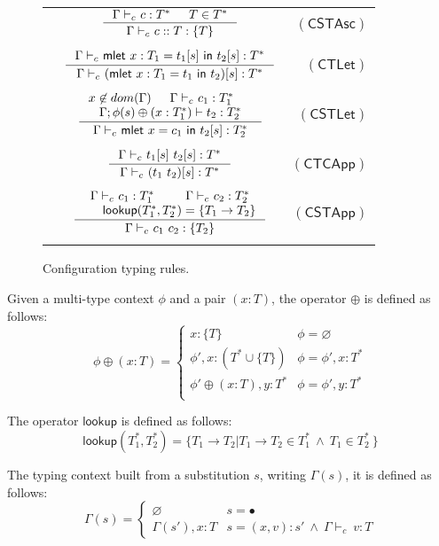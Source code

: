 \documentclass[preprint,authoryear,sort&compress,9pt,nocopyrightspace]{article}
\newcommand\rulename[1]{\mathsf{(#1)}}
\newcommand{\conf}[2][s]{(#2)[#1]}
\newcommand{\tyC}{{\Gamma \vdash_c \ }}
\newcommand{\ascrip}[1]{#1::T}
\newcommand{\oletP}[3]{\mathsf{mlet} \ x = #2 \ \mathsf{in}  \ #3}
\newcommand{\appD}{t_1 \ t_2}
\newcommand{\oletPT}[3]{\mathsf{mlet} \ x : #1 = #2 \ \mathsf{in}  \ #3}
\newcommand{\buscar}{\mathsf{lookup}}
\newcommand{\mtD}{T^{*}}
\newcommand{\mtP}[1]{#1^{*}}
\newcommand{\mtCu}[1]{\{ #1 \}}
\newcommand{\emt}{\phi}
\begin{document}
\begin{figure}
\begin{small}
\begin{center}
\begin{tabular}{|l c r|}
&$\inference{\tyC c : T^{*} & T \in  \mtD}{\tyC \ascrip{c} : \mtCu{T}}$&$\rulename{CSTAsc}$\\
&&\\
&$\inference{\tyC \oletPT{T_1}{t_1[s]}{t_2[s] : \mtP{T}}}{\tyC \conf{\oletPT{T_1}{t_1}{t_2}} : \mtP{T}}$&$\rulename{CTLet}$\\
&&\\
&$\inference{x \not \in dom(\Gamma) & \tyC c_1 : \mtP{T_1}  & \\ \Gamma ; \emt(s)  \oplus (x : T^{*}_1)  \vdash t_2 : \mtP{T_2}}{\tyC \oletP{T_1}{c_1}{t_2[s]} : \mtP{T_2}}$&$\rulename{CSTLet}$\\
&&\\
&$\inference {\tyC t_1[s] \ t_2[s] : \mtP{T}}{\tyC \conf{\appD} : \mtP{T}}$&$\rulename{CTCApp}$\\
&&\\
&$\inference {\tyC c_1 : T_1^{*} & \tyC c_2 : T_2^{*}  \\ & \buscar (T_1^{*}, T_2^{*}) = \{T_1 \to T_2\}}{\tyC c_1 \ c_2 : \{T_2\}}$&$\rulename{CSTApp}$\\
&&\\
\hline
\end{tabular}
\hspace*{-2.8cm}
\caption{Configuration typing rules.}
\label{tabla:confugurationtypingrule}
\end{center}

\end{small}
\end{figure}

\begin{definition}[$\oplus$]
\label{definition:tcs}
\mbox{}
Given a multi-type context $\emt$ and a pair $(x:T)$, the operator $\oplus$ is defined  as follows:
\[ \emt \oplus (x:T) = \begin{cases} 
      x:\mtCu{T}& \emt =  \varnothing \\
      \emt',x:(\mtD \cup \mtCu{T}) & \emt = \emt',x:\mtD\\
      \emt' \oplus (x:T),y:\mtD & \emt = \emt',y:\mtD\\
   \end{cases}
\]
\end{definition}


\begin{definition}[$\buscar$]
\label{definition:tcs}
\mbox{}
The operator $\buscar$ is defined  as follows:
\[ \buscar(T_1^{*}, T_2^{*}) =  
  \{T_1 \to T_2 | T_1 \to T_2 \in T_1^{*} \ \wedge \ T_1 \in T_2^{*} \ \}
\]
\end{definition}

\begin{definition}[$\Gamma(s)$]
\label{definition:tcs}
\mbox{}
The typing context built from a substitution $s$, writing $\Gamma(s)$, it is defined as follows:
\[ \Gamma(s) = \begin{cases} 
     \varnothing & s =  \bullet \\
      \Gamma(s'), x:T & s = (x,v):s' \ \land \ \tyC v : T 
   \end{cases}
\]
\end{definition}
\end{document}
